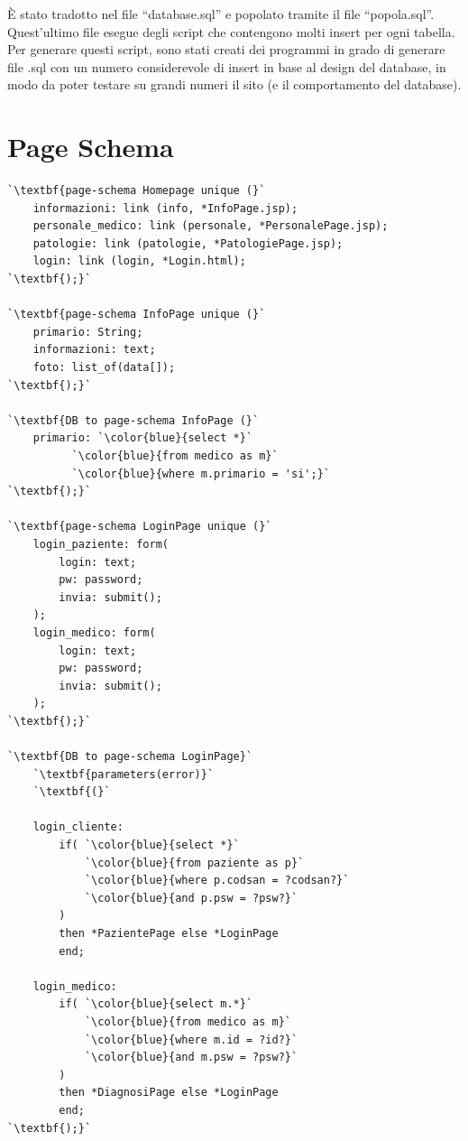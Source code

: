 \documentclass[a4paper,titlepage]{article}
\begin{document}
È stato tradotto nel file ``database.sql'' e popolato tramite il file ``popola.sql''. Quest'ultimo file esegue degli script che contengono molti insert per ogni tabella.
Per generare questi script, sono stati creati dei programmi in grado di generare file .sql con un numero considerevole di insert in base al design del database, in modo da poter testare su grandi numeri il sito (e il comportamento del database).

\newpage
\part{Page Schema}
\begin{lstlisting}
`\textbf{page-schema Homepage unique (}`
	informazioni: link (info, *InfoPage.jsp);
	personale_medico: link (personale, *PersonalePage.jsp);
	patologie: link (patologie, *PatologiePage.jsp);
	login: link (login, *Login.html);
`\textbf{);}`

`\textbf{page-schema InfoPage unique (}`
	primario: String;
	informazioni: text;
	foto: list_of(data[]);
`\textbf{);}`

`\textbf{DB to page-schema InfoPage (}`
	primario: `\color{blue}{select *}` 
		  `\color{blue}{from medico as m}`
		  `\color{blue}{where m.primario = 'si';}`
`\textbf{);}`

`\textbf{page-schema LoginPage unique (}`
	login_paziente: form(
		login: text;
		pw: password;
		invia: submit();
	);
	login_medico: form(
		login: text;
		pw: password;
		invia: submit();
	);
`\textbf{);}`

`\textbf{DB to page-schema LoginPage}`
	`\textbf{parameters(error)}`
	`\textbf{(}`

	login_cliente:
		if(	`\color{blue}{select *}`
			`\color{blue}{from paziente as p}`
			`\color{blue}{where p.codsan = ?codsan?}`
			`\color{blue}{and p.psw = ?psw?}`
		)
		then *PazientePage else *LoginPage
		end;

	login_medico:
		if(	`\color{blue}{select m.*}`
			`\color{blue}{from medico as m}`
			`\color{blue}{where m.id = ?id?}`
			`\color{blue}{and m.psw = ?psw?}`
		)
		then *DiagnosiPage else *LoginPage
		end;
`\textbf{);}`
\end{lstlisting}
\newpage
\end{document}
